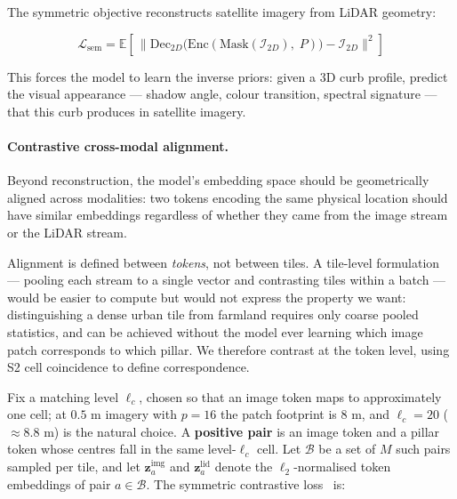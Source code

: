 \documentclass{book}
\begin{document}
The symmetric objective reconstructs satellite imagery from
LiDAR geometry:

\begin{equation}
  \mathcal{L}_{\text{sem}} =
    \mathbb{E}\!\left[\,\bigl\|
      \mathrm{Dec}_{2D}
        \bigl(\mathrm{Enc}(\mathrm{Mask}(\mathcal{I}_{2D}),\;
        P)\bigr)
      - \mathcal{I}_{2D}
    \bigr\|^2\right]
  \label{eq:cross_modal_sym}
\end{equation}

This forces the model to learn the inverse priors: given a 3D
curb profile, predict the visual appearance --- shadow angle,
colour transition, spectral signature --- that this curb
produces in satellite imagery.

\paragraph{Contrastive cross-modal alignment.}

Beyond reconstruction, the model's embedding space should be
geometrically aligned across modalities: two tokens encoding
the same physical location should have similar embeddings
regardless of whether they came from the image stream or the
LiDAR stream.

Alignment is defined between \emph{tokens}, not between tiles.  A
tile-level formulation --- pooling each stream to a single vector and
contrasting tiles within a batch --- would be easier to compute but
would not express the property we want: distinguishing a dense urban
tile from farmland requires only coarse pooled statistics, and can be
achieved without the model ever learning which image patch
corresponds to which pillar.  We therefore contrast at the token
level, using S2 cell coincidence to define correspondence.

Fix a matching level $\ell_c$, chosen so that an image token maps to
approximately one cell; at $0.5$ m imagery with $p = 16$ the patch
footprint is $8$ m, and $\ell_c = 20$ ($\approx 8.8$ m) is the
natural choice.  A \textbf{positive pair} is an image token and a
pillar token whose centres fall in the same level-$\ell_c$ cell.  Let
$\mathcal{B}$ be a set of $M$ such pairs sampled per tile, and let
$\mathbf{z}^{\text{img}}_a$ and $\mathbf{z}^{\text{lid}}_a$ denote
the $\ell_2$-normalised token embeddings of pair
$a \in \mathcal{B}$.  The symmetric contrastive
loss~\cite{radford2021clip,chen2020simclr} is:
\end{document}

